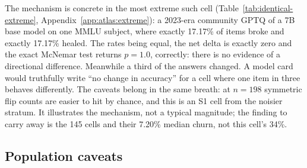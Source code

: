The mechanism is concrete in the most extreme such cell
(Table~\ref{tab:identical-extreme}, Appendix~\ref{app:atlas:extreme}): a 2023-era
community GPTQ of a 7B base model on one MMLU subject, where exactly 17.17\% of
items broke and exactly 17.17\% healed. The rates being equal, the net delta is
exactly zero and the exact McNemar test returns $p = 1.0$, correctly: there is no
evidence of a directional difference. Meanwhile a third of the answers changed. A
model card would truthfully write ``no change in accuracy'' for a cell where one
item in three behaves differently. The caveats belong in the same breath: at
$n = 198$ symmetric flip counts are easier to hit by chance, and this is an S1
cell from the noisier stratum. It illustrates the mechanism, not a typical
magnitude; the finding to carry away is the 145 cells and their 7.20\% median
churn, not this cell's 34\%.

\subsection{Population caveats}
\label{sec:atlas:caveats}


